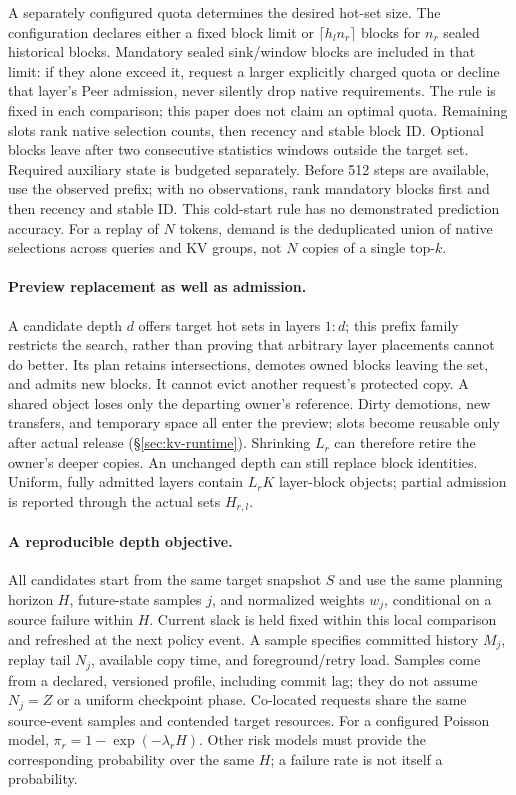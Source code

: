A separately configured quota determines the desired hot-set size.
The configuration declares either a fixed block limit or
$\lceil h_l n_r\rceil$ blocks for $n_r$ sealed historical blocks.
Mandatory sealed sink/window blocks are included in that limit: if they
alone exceed it, request a larger explicitly charged quota or decline
that layer's Peer admission, never silently drop native requirements.
The rule is
fixed in each comparison; this paper does not claim an optimal quota.
Remaining slots rank native selection counts, then recency and stable
block ID. Optional blocks leave after two consecutive statistics windows
outside the target set. Required auxiliary state is budgeted separately.
Before 512 steps are available, use the observed prefix; with no observations,
rank mandatory blocks first and then recency and stable ID. This cold-start
rule has no demonstrated prediction accuracy.
For a replay of $N$ tokens, demand is the deduplicated union of native
selections across queries and KV groups, not $N$ copies of a single top-$k$.

\paragraph{Preview replacement as well as admission.}
A candidate depth $d$ offers target hot sets in layers $1{:}d$;
this prefix family restricts the search, rather than proving that arbitrary
layer placements cannot do better.
Its plan retains intersections, demotes owned blocks leaving the set,
and admits new blocks. It cannot evict another request's protected copy.
A shared object loses only the departing owner's reference.
Dirty demotions, new transfers, and temporary space all enter the preview;
slots become reusable only after actual release
(\S\ref{sec:kv-runtime}). Shrinking $L_r$ can therefore retire the owner's
deeper copies. An unchanged depth can still replace block identities.
Uniform, fully admitted layers contain $L_r K$ layer-block objects;
partial admission is reported through the actual sets $H_{r,l}$.

\paragraph{A reproducible depth objective.}
All candidates start from the same target snapshot $S$ and use the same
planning horizon $H$, future-state samples $j$, and normalized weights $w_j$,
conditional on a source failure within $H$. Current slack is held fixed
within this local comparison and refreshed at the next policy event.
A sample specifies committed history $M_j$, replay tail $N_j$, available
copy time, and foreground/retry load. Samples come from a declared,
versioned profile, including commit lag; they do not assume $N_j=Z$ or
a uniform checkpoint phase. Co-located requests share the same source-event
samples and contended target resources. For a configured Poisson model,
$\pi_r=1-\exp(-\lambda_r H)$. Other risk models must provide the corresponding
probability over the same $H$; a failure rate is not itself a probability.

